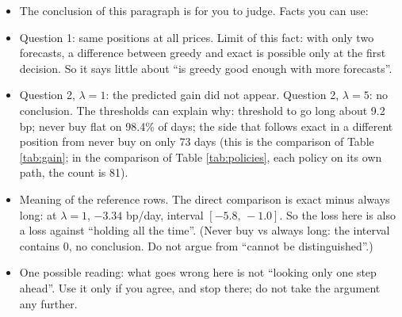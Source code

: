 \documentclass{article}
\newenvironment{pts}{\begin{itemize}[nosep,leftmargin=1.15em,topsep=1pt]}{\end{itemize}}
\begin{document}
\begin{note}
\begin{pts}
\item The conclusion of this paragraph is for you to judge. Facts you can use:
\item Question 1: same positions at all prices. Limit of this fact: with only two forecasts, a difference between greedy and exact is possible only at the first decision. So it says little about ``is greedy good enough with more forecasts''.
\item Question 2, $\lambda=1$: the predicted gain did not appear. Question 2, $\lambda=5$: no conclusion. The thresholds can explain why: threshold to go long about 9.2 bp; never buy flat on 98.4\% of days; the side that follows exact in a different position from never buy on only 73 days (this is the comparison of Table \ref{tab:gain}; in the comparison of Table \ref{tab:policies}, each policy on its own path, the count is 81).
\item Meaning of the reference rows. The direct comparison is exact minus always long: at $\lambda=1$, $-3.34$ bp/day, interval $[-5.8,\,-1.0]$. So the loss here is also a loss against ``holding all the time''. (Never buy vs always long: the interval contains 0, no conclusion. Do not argue from ``cannot be distinguished''.)
\item One possible reading: what goes wrong here is not ``looking only one step ahead''. Use it only if you agree, and stop there; do not take the argument any further.
\end{pts}
\end{note}
\end{document}
